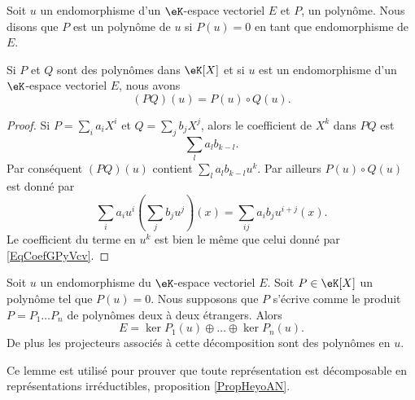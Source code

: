 Soit \( u\) un endomorphisme d'un \( \eK\)-espace vectoriel \( E\) et \( P\), un polynôme. Nous disons que \( P\) est un polynôme  de \( u\) si \( P(u)=0\) en tant que endomorphisme de \( E\).

\begin{lemma}       \label{LemQWvhYb}
    Si \( P\) et \( Q\) sont des polynômes dans \( \eK[X]\) et si \( u\) est un endomorphisme d'un \( \eK\)-espace vectoriel \( E\), nous avons
    \begin{equation}
        (PQ)(u)=P(u)\circ Q(u).
    \end{equation}
\end{lemma}

\begin{proof}
    Si \( P=\sum_i a_iX^i\) et \( Q=\sum_j b_jX^j\), alors le coefficient de \( X^k\) dans \( PQ\) est
    \begin{equation}        \label{EqCoefGPyVcv}
        \sum_la_lb_{k-l}.
    \end{equation}
    Par conséquent \( (PQ)(u)\) contient \( \sum_la_lb_{k-l}u^k\). Par ailleurs \( P(u)\circ Q(u)\) est donné par
    \begin{equation}
        \sum_ia_iu^i\left( \sum_jb_ju^j \right)(x)=\sum_{ij}a_ib_ju^{i+j}(x).
    \end{equation}
    Le coefficient du terme en \( u^k\) est bien le même que celui donné par \eqref{EqCoefGPyVcv}.
\end{proof}

\begin{theorem}       \label{ThoDecompNoyayzzMWod}
    Soit \( u\) un endomorphisme du \( \eK\)-espace vectoriel \( E\). Soit \( P\in\eK[X]\) un polynôme tel que \( P(u)=0\). Nous supposons que \( P\) s'écrive comme le produit \( P=P_1\ldots P_n\) de polynômes deux à deux étrangers. Alors
    \begin{equation}
        E=\ker P_1(u)\oplus\ldots\oplus\ker P_n(u).
    \end{equation}
    De plus les projecteurs associés à cette décomposition sont des polynômes en \( u\).
\end{theorem}
Ce lemme est utilisé pour prouver que toute représentation est décomposable en représentations irréductibles, proposition \ref{PropHeyoAN}.

